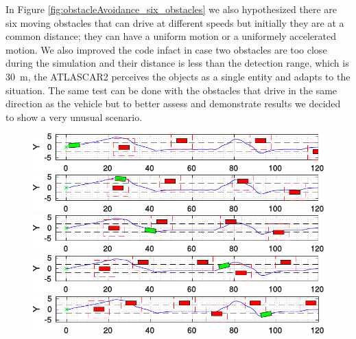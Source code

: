 In Figure \ref{fig:obstacleAvoidance_six_obstacles} we also hypothesized there are six moving obstacles that can drive at different speeds but initially they are at a common distance; they can have a uniform motion or a uniformely accelerated motion. We also improved the code infact in case two obstacles are too close during the simulation and their distance is less than the detection range, which is \SI{30}{m}, the ATLASCAR2 perceives the objects as a single entity and adapts to the situation. The same test can be done with the obstacles that drive in the same direction as the vehicle but to better assess and demonstrate results we decided to show a very unusual scenario. 
\begin{figure}[b!]
	\centering
	\begin{minipage}[t]{\textwidth}
		\includegraphics[width=\textwidth]{./figure/6_obstacles/6_obstacles_1.pdf}
	\end{minipage}
	\begin{minipage}[t]{\textwidth}
		\includegraphics[width=\textwidth]{./figure/6_obstacles/6_obstacles_2.pdf}
	\end{minipage}
	\begin{minipage}[t]{\textwidth}
		\includegraphics[width=\textwidth]{./figure/6_obstacles/6_obstacles_3.pdf}
	\end{minipage}
	\begin{minipage}[t]{\textwidth}
		\includegraphics[width=\textwidth]{./figure/6_obstacles/6_obstacles_4.pdf}
	\end{minipage}
	\begin{minipage}[t]{\textwidth}
		\includegraphics[width=\textwidth]{./figure/6_obstacles/6_obstacles_5.pdf}

\end{minipage}
\end{figure}
